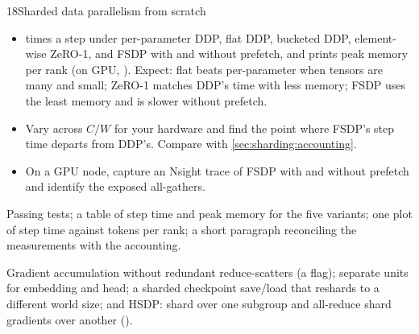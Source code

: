 \begin{labbox}{18}{Sharded data parallelism from scratch}
\begin{itemize}
  \item {} times a step under per-parameter DDP, flat DDP, bucketed DDP, element-wise
    ZeRO-1, and FSDP with and without prefetch, and prints peak memory per rank (on GPU,
    ). Expect: flat beats per-parameter when tensors are
    many and small; ZeRO-1 matches DDP's time with less memory; FSDP uses the least memory and is
    slower without prefetch.
  \item Vary  across $C/W$ for your hardware and find the point where
    FSDP's step time departs from DDP's. Compare with \cref{sec:sharding:accounting}.
  \item On a GPU node, capture an Nsight trace of FSDP with and without prefetch and identify the
    exposed all-gathers.
\end{itemize}

Passing tests; a table of step time and peak memory for the five variants; one plot of step time
against tokens per rank; a short paragraph reconciling the measurements with the accounting.

Gradient accumulation without redundant reduce-scatters (a  flag); separate units
for embedding and head; a sharded checkpoint save/load that reshards to a different world size;
and HSDP: shard over one subgroup and all-reduce shard gradients over another
().
\end{labbox}
